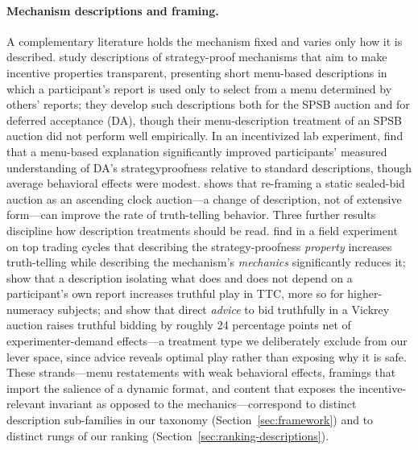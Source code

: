 \paragraph{Mechanism descriptions and framing.}
A complementary literature holds the mechanism fixed and varies only how it is described. \citet{gonczarowski2023strategyproofness} study descriptions of strategy-proof mechanisms that aim to make incentive properties transparent, presenting short menu-based descriptions in which a participant's report is used only to select from a menu determined by others' reports; they develop such descriptions both for the SPSB auction and for deferred acceptance (DA), though their menu-description treatment of an SPSB auction did not perform well empirically. In an incentivized lab experiment, \citet{gonczarowski2024describing} find that a menu-based explanation significantly improved participants' measured understanding of DA's strategyproofness relative to standard descriptions, though average behavioral effects were modest. \citet{breitmoser2022obviousness} shows that re-framing a static sealed-bid auction as an ascending clock auction---a change of description, not of extensive form---can improve the rate of truth-telling behavior. Three further results discipline how description treatments should be read. \citet{guillen2018effectiveness} find in a field experiment on top trading cycles that describing the strategy-proofness \emph{property} increases truth-telling while describing the mechanism's \emph{mechanics} significantly reduces it; \citet{katuscak2024simpler} show that a description isolating what does and does not depend on a participant's own report increases truthful play in TTC, more so for higher-numeracy subjects; and \citet{masuda2022net} show that direct \emph{advice} to bid truthfully in a Vickrey auction raises truthful bidding by roughly 24 percentage points net of experimenter-demand effects---a treatment type we deliberately exclude from our lever space, since advice reveals optimal play rather than exposing why it is safe. These strands---menu restatements with weak behavioral effects, framings that import the salience of a dynamic format, and content that exposes the incentive-relevant invariant as opposed to the mechanics---correspond to distinct description sub-families in our taxonomy (Section~\ref{sec:framework}) and to distinct rungs of our ranking (Section~\ref{sec:ranking-descriptions}).

